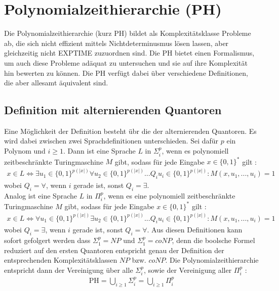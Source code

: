 \chapter{Polynomialzeithierarchie (PH)} \label{chapter: Polynomialzeithierarchie (PH)}
Die Polynomialzeithierarchie (kurz PH) bildet als Komplexitätsklasse Probleme ab, die sich nicht effizient mittels Nichtdeterminusmus lösen lassen, aber gleichzeitig 
nicht EXPTIME zuzuordnen sind. Die PH bietet einen Formalismus, um auch diese Probleme adäquat zu untersuchen und sie auf ihre Komplexität hin bewerten zu können.
Die PH verfügt dabei über verschiedene Definitionen, die aber allesamt äquivalent sind.


\section{Definition mit alternierenden Quantoren} \label{section: Definition PH mit alternierenden Quantoren}
Eine Möglichkeit der Definition besteht übr die der alternierenden Quantoren. Es wird dabei zwischen zwei Sprachdefinitionen unterschieden.
Sei dafür $p$ ein Polynom und $i \geq 1$. Dann ist eine Sprache $L$ in $\Sigma^p_i$, wenn es polynomiell zeitbeschränkte Turingmaschine $M$ gibt, 
sodass für jede Eingabe $x \in \{0,1\}^*$ gilt \cite{rossman_complexity_2015}:
\begin{align*}
    x \in L \Leftrightarrow \exists u_1 \in \{0,1\}^{p(|x|)} \forall u_2 \in \{0,1\}^{p(|x|)} ... Q_i u_i \in \{0,1\}^{p(|x|)} : M(x, u_1, ..., u_i) = 1
\end{align*}
wobei $Q_i = \forall$, wenn $i$ gerade ist, sonst $Q_i = \exists$. \\
Analog ist eine Sprache $L$ in $\Pi^p_i$, wenn es eine polynomiell zeitbeschränkte Turingmaschine $M$ gibt, sodass für jede Eingabe $x \in \{0,1\}^*$ gilt \cite{arora_computational_2009}:
\begin{align*}
    x \in L \Leftrightarrow \forall u_1 \in \{0,1\}^{p(|x|)} \exists u_2 \in \{0,1\}^{p(|x|)} ... Q_i u_i \in \{0,1\}^{p(|x|)} : M(x, u_1, ..., u_i) = 1
\end{align*}
wobei $Q_i = \exists$, wenn $i$ gerade ist, sonst $Q_i = \forall$.
Aus diesen Definitionen kann sofort gefolgert werden dass $\Sigma^p_1 = NP$ und $\Sigma^p_1 = coNP$, denn die boolsche Formel reduziert auf 
den ersten Quantoren entspricht genau der Definition der entsprechenden Komplexitätsklassen $NP$ bzw. $coNP$.
Die Polynomialzeithierarchie entspricht dann der Vereinigung über alle $\Sigma^p_i$, sowie der Vereinigung aller $\Pi^p_i$ \cite{sipser_introduction_2012}:
\begin{align*}
    \text{PH} = \bigcup_{i \geq 1} \Sigma^p_i = \bigcup_{i \geq 1} \Pi^p_i 
\end{align*}
